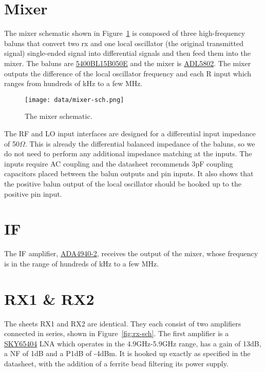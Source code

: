 \documentclass{default}
\begin{document}
\section{Mixer}
The mixer schematic shown in Figure~\ref{fig:mixer-sch} is composed of three high-frequency baluns
that convert two rx and one local oscillator (the original transmitted signal) single-ended signal
into differential signals and then feed them into the mixer. The baluns are
\href{https://www.johansontechnology.com/datasheets/baluns/Balun_5400BL15B050.pdf}{5400BL15B050E}
and the mixer is
\href{http://www.analog.com/media/en/technical_documentation/data_sheets/ADL5802.pdf}{ADL5802}. The
mixer outputs the difference of the local oscillator frequency and each R input which ranges from
hundreds of kHz to a few MHz.

\begin{figure}[ht]
  \centering
  \texttt{[image: data/mixer-sch.png]}
  \caption{The mixer schematic.}
  \label{fig:mixer-sch}
\end{figure}

The RF and LO input interfaces are designed for a differential input impedance of 50$\Omega$. This
is already the differential balanced impedance of the baluns, so we do not need to perform any
additional impedance matching at the inputs. The inputs require AC coupling and the datasheet
recommends 3pF coupling capacitors placed between the balun outputs and pin inputs. It also shows
that the positive balun output of the local oscillator should be hooked up to the positive pin
input.

\section{IF}

The IF amplifier,
\href{http://www.analog.com/media/en/technical-documentation/data-sheets/ADA4940-1_4940-2.pdf}{ADA4940-2},
receives the output of the mixer, whose frequency is in the range of hundreds of kHz to a few MHz.

\section{RX1 \& RX2}

The sheets RX1 and RX2 are identical. They each consist of two amplifiers connected in series, shown
in Figure~\ref{fig:rx-sch}. The first amplifier is a
\href{http://www.skyworksinc.com/uploads/documents/SKY65404_31_201512J.pdf}{SKY65404} LNA which
operates in the 4.9GHz-5.9GHz range, has a gain of 13dB, a NF of 1dB and a P1dB of -4dBm. It is
hooked up exactly as specified in the datasheet, with the addition of a ferrite bead filtering its
power supply.
\end{document}
